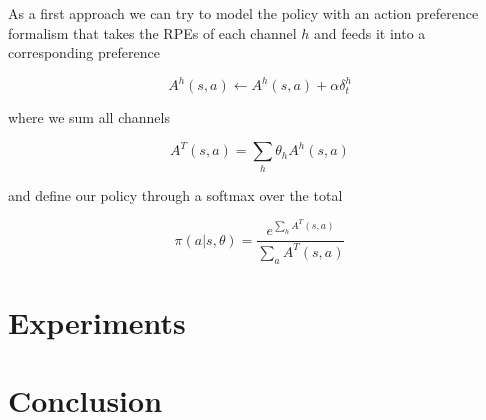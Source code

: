 \documentclass{article}
\begin{document}
As a first approach we can try to model the policy with an action preference formalism that takes the RPEs of each channel $h$
and feeds it into a corresponding preference 

\begin{equation}
  A^h(s,a) \leftarrow A^h(s,a) + \alpha \delta^h_t
\end{equation}

where we sum all channels

\begin{equation}
  A^T(s,a) = \sum_h \theta_h A^h(s,a)
\end{equation}

and define our policy through a softmax over the total

\begin{equation}
  \pi(a|s, \theta) = \frac{e^{\sum_h A^T(s,a)}}{\sum_a A^T(s,a)}
\end{equation}

\section{Experiments}

\section{Conclusion}

% 
% 
\end{document}
